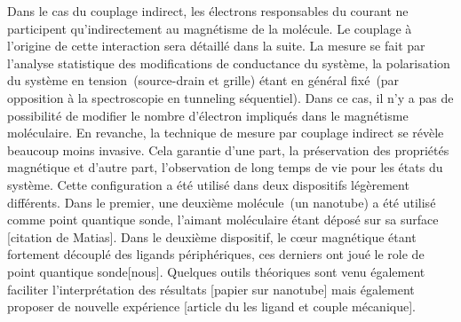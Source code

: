 Dans le cas du couplage indirect, les électrons responsables du courant ne participent qu'indirectement au magnétisme de la molécule. Le couplage à l'origine de cette interaction sera détaillé dans la suite. La mesure se fait par l'analyse statistique des modifications de conductance du système, la polarisation du système en tension~(source-drain et grille) étant en général fixé~(par opposition à la spectroscopie en tunneling séquentiel). Dans ce cas, il n'y a pas de possibilité de modifier le nombre d'électron impliqués dans le magnétisme moléculaire. En revanche, la technique de mesure par couplage indirect se révèle beaucoup moins invasive. Cela garantie d'une part, la préservation des propriétés magnétique et d'autre part, l'observation de long temps de vie pour les états du système. Cette configuration a été utilisé dans deux dispositifs légèrement différents. Dans le premier, une deuxième molécule~(un nanotube) a été utilisé comme point quantique sonde, l'aimant moléculaire étant déposé sur sa surface [citation de Matias]. Dans le deuxième dispositif, le cœur magnétique étant fortement découplé des ligands périphériques, ces derniers ont joué le role de point quantique sonde[nous]. Quelques outils théoriques sont venu également faciliter l'interprétation des résultats [papier sur nanotube] mais également proposer de nouvelle expérience [article du les ligand et couple mécanique].